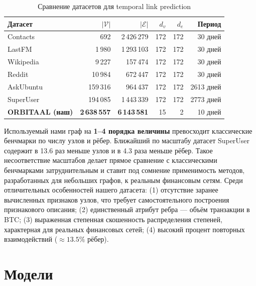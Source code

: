 \documentclass[a4paper,12pt]{extarticle}
\begin{document}
\begin{table}[ht]
    \caption{Сравнение датасетов для temporal link prediction}
    \label{table:dataset_comparison}
    \footnotesize
    \centering
    \begin{tabular}{lrrrrr}
        \toprule
        Датасет & $|\mathcal{V}|$ & $|\mathcal{E}|$ & $d_v$ & $d_e$ & Период \\
        \midrule
        Contacts~\cite{poursafaei2022towards}   & 692         & 2\,426\,279   & 172 & 172 & 30 дней \\
        LastFM~\cite{poursafaei2022towards}     & 1\,980      & 1\,293\,103   & 172 & 172 & 30 дней \\
        Wikipedia~\cite{kumar2019predicting}    & 9\,227      & 157\,474      & 172 & 172 & 30 дней \\
        Reddit~\cite{kumar2019predicting}       & 10\,984     & 672\,447      & 172 & 172 & 30 дней \\
        AskUbuntu~\cite{paranjape2017motifs}    & 159\,316    & 964\,437      & 172 & 172 & 2613 дней \\
        SuperUser~\cite{paranjape2017motifs}    & 194\,085    & 1\,443\,339   & 172 & 172 & 2773 дней \\
        \midrule
        \textbf{ORBITAAL (наш)} & \textbf{2\,638\,557} & \textbf{6\,143\,581} & 15 & 2 & 10 дней \\
        \bottomrule
    \end{tabular}
\end{table}

Используемый нами граф на \textbf{1--4 порядка величины} превосходит классические бенчмарки по числу узлов и рёбер. Ближайший по масштабу датасет SuperUser содержит в 13.6 раз меньше узлов и в 4.3 раза меньше рёбер. Такое несоответствие масштабов делает прямое сравнение с классическими бенчмарками затруднительным и ставит под сомнение применимость методов, разработанных для небольших графов, к реальным финансовым сетям. Среди отличительных особенностей нашего датасета: (1) отсутствие заранее вычисленных признаков узлов, что требует самостоятельного построения признакового описания; (2) единственный атрибут ребра --- объём транзакции в BTC; (3) выраженная степенная скошенность распределения степеней, характерная для реальных финансовых сетей; (4) высокий процент повторных взаимодействий ($\approx 13.5\%$ рёбер).

\newpage

\section{Модели}
\end{document}
